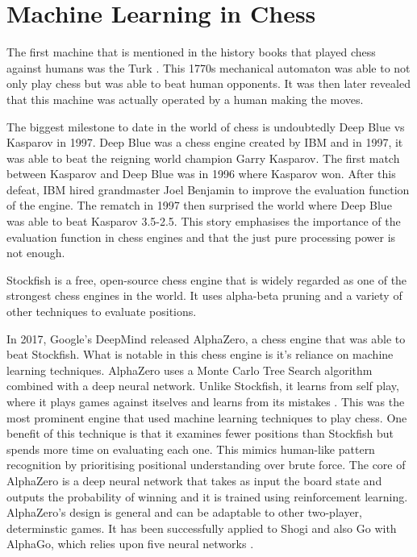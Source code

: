 \section{Machine Learning in Chess}

The first machine that is mentioned in the history books that played chess against humans was the Turk \cite{stephensMechanicalTurkShort2023}. This 1770s mechanical automaton was able to not only play chess but was able to beat human opponents. It was then later revealed that this machine was actually operated by a human making the moves. 

The biggest milestone to date in the world of chess is undoubtedly Deep Blue vs Kasparov in 1997. Deep Blue was a chess engine created by IBM and in 1997, it was able to beat the reigning world champion Garry Kasparov. The first match between Kasparov and Deep Blue was in 1996 where Kasparov won. After this defeat, IBM hired grandmaster Joel Benjamin to improve the evaluation function of the engine. The rematch in 1997 then surprised the world where Deep Blue was able to beat Kasparov 3.5-2.5. This story emphasises the importance of the evaluation function in chess engines and that the just pure processing power is not enough. 

Stockfish is a free, open-source chess engine that is widely regarded as one of the strongest chess engines in the world. It uses alpha-beta pruning and a variety of other techniques to evaluate positions. 

In 2017, Google's DeepMind released AlphaZero, a chess engine that was able to beat Stockfish. What is notable in this chess engine is it's reliance on machine learning techniques. AlphaZero uses a Monte Carlo Tree Search algorithm combined with a deep neural network. Unlike Stockfish, it learns from self play, where it plays games against itselves and learns from its mistakes \cite{kleinNeuralNetworksChess2022}. This was the most prominent engine that used machine learning techniques to play chess. One benefit of this technique is that it examines fewer positions than Stockfish but spends more time on evaluating each one. This mimics human-like pattern recognition by prioritising positional understanding over brute force. The core of AlphaZero is a deep neural network that takes as input the board state and outputs the probability of winning and it is trained using reinforcement learning. AlphaZero's design is general and can be adaptable to other two-player, determinstic games. It has been successfully applied to Shogi and also Go with AlphaGo, which relies upon five neural networks \cite{kleinNeuralNetworksChess2022}.

